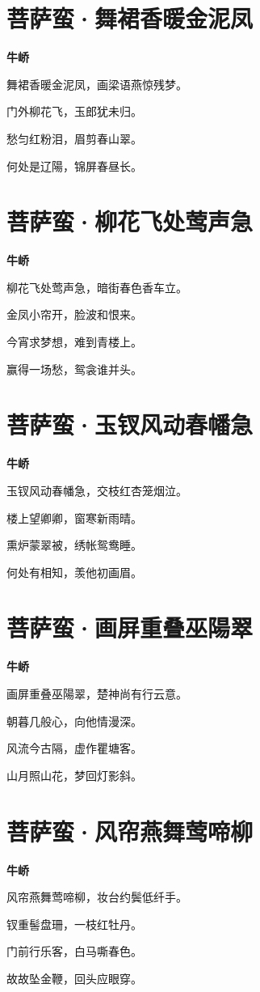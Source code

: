 \documentclass[12pt,a4paper]{ctexbook}
\begin{document}
\section{菩萨蛮·舞裙香暖金泥凤}
\textbf{牛峤}\par\vspace{0.5em}
舞裙香暖金泥凤，画梁语燕惊残梦。\par
门外柳花飞，玉郎犹未归。\par
愁匀红粉泪，眉剪春山翠。\par
何处是辽陽，锦屏春昼长。\par

\section{菩萨蛮·柳花飞处莺声急}
\textbf{牛峤}\par\vspace{0.5em}
柳花飞处莺声急，暗街春色香车立。\par
金凤小帘开，脸波和恨来。\par
今宵求梦想，难到青楼上。\par
赢得一场愁，鸳衾谁并头。\par

\section{菩萨蛮·玉钗风动春幡急}
\textbf{牛峤}\par\vspace{0.5em}
玉钗风动春幡急，交枝红杏笼烟泣。\par
楼上望卿卿，窗寒新雨晴。\par
熏炉蒙翠被，绣帐鸳鸯睡。\par
何处有相知，羡他初画眉。\par

\section{菩萨蛮·画屏重叠巫陽翠}
\textbf{牛峤}\par\vspace{0.5em}
画屏重叠巫陽翠，楚神尚有行云意。\par
朝暮几般心，向他情漫深。\par
风流今古隔，虚作瞿塘客。\par
山月照山花，梦回灯影斜。\par

\section{菩萨蛮·风帘燕舞莺啼柳}
\textbf{牛峤}\par\vspace{0.5em}
风帘燕舞莺啼柳，妆台约鬓低纤手。\par
钗重髻盘珊，一枝红牡丹。\par
门前行乐客，白马嘶春色。\par
故故坠金鞭，回头应眼穿。\par
\end{document}
